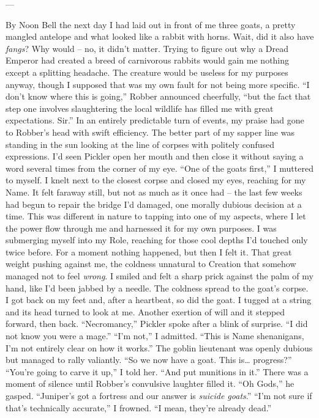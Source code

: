 \documentclass[12pt, openany]{book}
\begin{document}
—

By Noon Bell the next day I had laid out in front of me three goats, a pretty mangled antelope and what looked like a rabbit with horns. Wait, did it also have \textit{fangs}? Why would – no, it didn’t matter. Trying to figure out why a Dread Emperor had created a breed of carnivorous rabbits would gain me nothing except a splitting headache. The creature would be useless for my purposes anyway, though I supposed that was my own fault for not being more specific.
“I don’t know where this is going,” Robber announced cheerfully, “but the fact that step one involves slaughtering the local wildlife has filled me with great expectations. Sir.”
In an entirely predictable turn of events, my praise had gone to Robber’s head with swift efficiency. The better part of my sapper line was standing in the sun looking at the line of corpses with politely confused expressions. I’d seen Pickler open her mouth and then close it without saying a word several times from the corner of my eye.
“One of the goats first,” I muttered to myself.
I knelt next to the closest corpse and closed my eyes, reaching for my Name. It felt faraway still, but not as much as it once had – the last few weeks had begun to repair the bridge I’d damaged, one morally dubious decision at a time. This was different in nature to tapping into one of my aspects, where I let the power flow through me and harnessed it for my own purposes. I was submerging myself into my Role, reaching for those cool depths I’d touched only twice before. For a moment nothing happened, but then I felt it. That great weight pushing against me, the coldness unnatural to Creation that somehow managed not to feel \textit{wrong}. I smiled and felt a sharp prick against the palm of my hand, like I’d been jabbed by a needle. The coldness spread to the goat’s corpse. I got back on my feet and, after a heartbeat, so did the goat. I tugged at a string and its head turned to look at me. Another exertion of will and it stepped forward, then back.
“Necromancy,” Pickler spoke after a blink of surprise. “I did not know you were a mage.”
“I’m not,” I admitted. “This is Name shenanigans, I’m not entirely clear on how it works.”
The goblin lieutenant was openly dubious but managed to rally valiantly. “So we now have a goat. This is… progress?”
“You’re going to carve it up,” I told her. “And put munitions in it.”
There was a moment of silence until Robber’s convulsive laughter filled it.
“Oh Gods,” he gasped. “Juniper’s got a fortress and our answer is \textit{suicide goats}.”
“I’m not sure if that’s technically accurate,” I frowned. “I mean, they’re already dead.”
\end{document}
